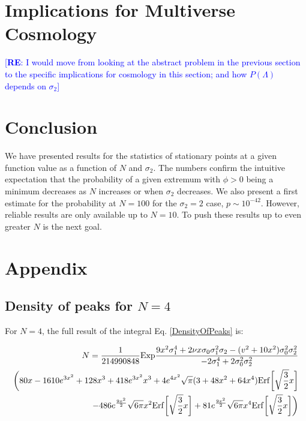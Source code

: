 \documentclass[12pt]{article}
\newcommand{\re}[1]{\textcolor{blue}{[{\bf RE}: #1]}}
\begin{document}

\section{Implications for Multiverse Cosmology}

\re{I would move from looking at the abstract problem in the previous section to the specific implications for cosmology in this section; and how $P(\Lambda)$ depends on $\sigma_2$}

\section{Conclusion}
We have presented results for the statistics of stationary points at a given function value as a function of $N$ and $\sigma_2$. The numbers confirm the intuitive expectation that the probability of a given extremum with $\phi > 0$ being a minimum decreases as $N$ increases or when $\sigma_2$ decreases. We also present a first estimate for the probability at $N=100$ for the $\sigma_2=2$ case, $p \sim 10^{-42}$. However, reliable results are only available up to $N=10$. To push these results up to even greater $N$ is the next goal.

\section{Appendix}
\subsection{Density of peaks for $N=4$} 
For $N=4$, the full result of the integral Eq. \ref{DensityOfPeaks} is:

\begin{equation}
\begin{split}
N = \frac{1}{214990848} \mathrm{Exp}\frac{9x^2\sigma_1^4 + 2\nu x \sigma_0 \sigma_1^2 \sigma_2 - (v^2+10x^2)\sigma_0^2\sigma_2^2}{-2\sigma_1^4+2\sigma_0^2\sigma_2^2}\\\bigg{(}80x - 1610e^{3x^2}+128x^3+418e^{3x^2}x^3+4e^{4x^2}\sqrt{\pi}(3+48x^2+64x^4)\mathrm{Erf}\bigg{[}\sqrt{\frac{3}{2}}x\bigg{]}\\
-486e^{\frac{9x^2}{2}}\sqrt{6\pi}x^2\mathrm{Erf}\bigg{[}\sqrt{\frac{3}{2}}x\bigg{]}+81e^{\frac{9x^2}{2}}\sqrt{6\pi}x^4\mathrm{Erf}\bigg{[}\sqrt{\frac{3}{2}}x\bigg{]}\bigg{)}
\end{split}
\end{equation}
\end{document}
